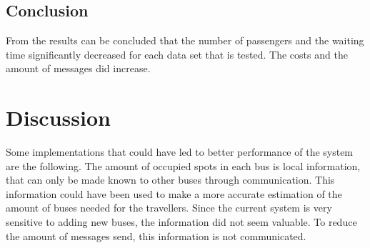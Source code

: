 \documentclass{article}
\begin{document}
\subsection{Conclusion}
From the results can be concluded that the number of passengers and the waiting time significantly decreased for each data set that is tested. The costs and the amount of messages did increase.

\section{Discussion}
Some implementations that could have led to better performance of the system are the following.
\newline
The amount of occupied spots in each bus is local information, that can only be made known to other buses through communication. This information could have been used to make a more accurate estimation of the amount of buses needed for the travellers. Since the current system is very sensitive to adding new buses, the information did not seem valuable. To reduce the amount of messages send, this information is not communicated.

\newpage
\onecolumn


\end{document}
